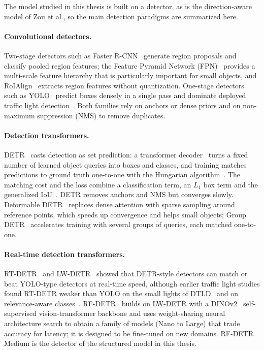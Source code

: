 The model studied in this thesis is built on a detector, as is the direction-aware model of Zou et al.,
so the main detection paradigms are summarized here.

\paragraph{Convolutional detectors.} Two-stage detectors such as Faster R-CNN~\cite{ren2015faster}
generate region proposals and classify pooled region features; the Feature Pyramid Network
(FPN)~\cite{lin2017feature} provides a multi-scale feature hierarchy that is particularly important for
small objects, and RoIAlign~\cite{he2017mask} extracts region features without quantization. One-stage
detectors such as YOLO~\cite{redmon2016you} predict boxes densely in a single pass and dominate
deployed traffic light detection~\cite{polley2024tldready,polley2025atlas}. Both families rely on
anchors or dense priors and on non-maximum suppression (NMS) to remove duplicates.

\paragraph{Detection transformers.} DETR~\cite{carion2020end} casts detection as set prediction: a
transformer decoder~\cite{vaswani2017attention} turns a fixed number of learned object queries into
boxes and classes, and training matches predictions to ground truth one-to-one with the Hungarian
algorithm~\cite{kuhn1955hungarian}. The matching cost and the loss combine a classification term, an
$L_1$ box term and the generalized IoU~\cite{rezatofighi2019generalized}. DETR removes anchors and NMS
but converges slowly. Deformable DETR~\cite{zhu2021deformable} replaces dense attention with sparse
sampling around reference points, which speeds up convergence and helps small objects; Group
DETR~\cite{chen2023group} accelerates training with several groups of queries, each matched
one-to-one.

\paragraph{Real-time detection transformers.} RT-DETR~\cite{zhao2024detrs} and
LW-DETR~\cite{chen2024lwdetr} showed that DETR-style detectors can match or beat YOLO-type detectors at
real-time speed, although earlier traffic light studies found RT-DETR weaker than YOLO on the small
lights of DTLD~\cite{polley2024tldready} and on relevance-aware classes~\cite{trinci2026color}.
RF-DETR~\cite{robinson2025rfdetr} builds on LW-DETR with a DINOv2~\cite{oquab2024dinov2}
self-supervised vision-transformer backbone and uses weight-sharing neural architecture search to
obtain a family of models (Nano to Large) that trade accuracy for latency; it is designed to be
fine-tuned on new domains. RF-DETR Medium is the detector of the structured model in this thesis.


